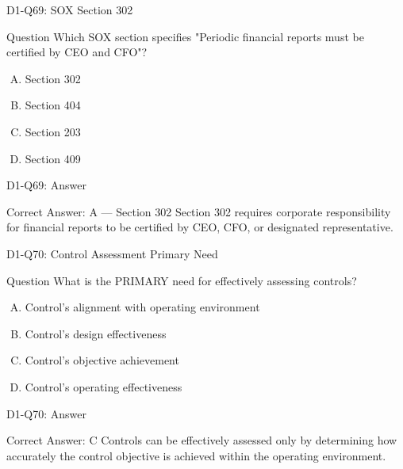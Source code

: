 \documentclass{beamer}
\begin{document}
	\begin{frame}{D1-Q69: SOX Section 302}
		\begin{block}{Question}
			Which SOX section specifies "Periodic financial reports must be certified by CEO and CFO"?
		\end{block}
		\begin{enumerate}[(A)]
			\item Section 302
			\item Section 404
			\item Section 203
			\item Section 409
		\end{enumerate}
	\end{frame}
	\begin{frame}{D1-Q69: Answer}
		\begin{block}{Correct Answer: A --- Section 302}
			Section 302 requires corporate responsibility for financial reports to be certified by CEO, CFO, or designated representative.
		\end{block}
	\end{frame}
	
	\begin{frame}{D1-Q70: Control Assessment Primary Need}
		\begin{block}{Question}
			What is the PRIMARY need for effectively assessing controls?
		\end{block}
		\begin{enumerate}[(A)]
			\item Control's alignment with operating environment
			\item Control's design effectiveness
			\item Control's objective achievement
			\item Control's operating effectiveness
		\end{enumerate}
	\end{frame}
	\begin{frame}{D1-Q70: Answer}
		\begin{block}{Correct Answer: C}
			Controls can be effectively assessed only by determining how accurately the control objective is achieved within the operating environment.
		\end{block}
	\end{frame}
	
\end{document}
